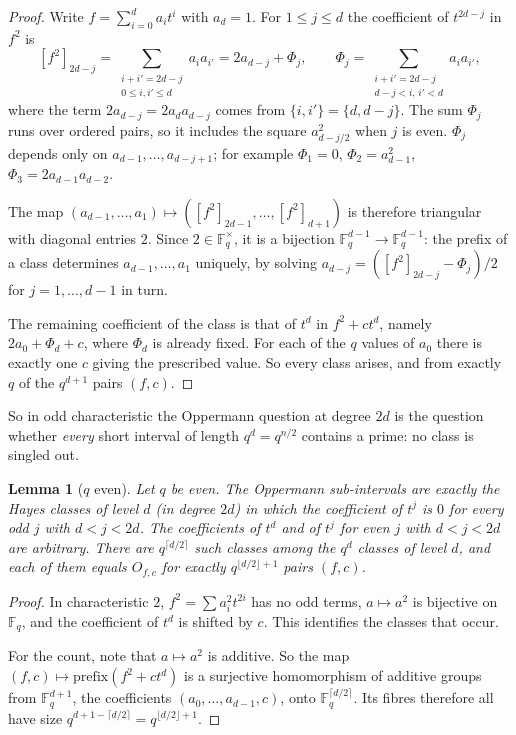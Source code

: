 \documentclass[11pt,a4paper]{amsart}
\newtheorem{lemma}[theorem]{Lemma}
\theoremstyle{definition}
\theoremstyle{remark}
\newcommand{\F}{\mathbb{F}}
\begin{document}
\begin{proof}
Write $f=\sum_{i=0}^da_it^i$ with $a_d=1$. For $1\le j\le d$ the coefficient of $t^{2d-j}$ in $f^2$ is
\[
[f^2]_{2d-j}=\sum_{\substack{i+i'=2d-j\\ 0\le i,i'\le d}}a_ia_{i'}
=2a_{d-j}+\Phi_j,\qquad
\Phi_j=\sum_{\substack{i+i'=2d-j\\ d-j<i,\,i'<d}}a_ia_{i'} ,
\]
where the term $2a_{d-j}=2a_da_{d-j}$ comes from $\{i,i'\}=\{d,d-j\}$. The sum $\Phi_j$ runs over ordered pairs, so
it includes the square $a_{d-j/2}^2$ when $j$ is even. $\Phi_j$ depends only on $a_{d-1},\dots,a_{d-j+1}$; for
example $\Phi_1=0$, $\Phi_2=a_{d-1}^2$, $\Phi_3=2a_{d-1}a_{d-2}$.

The map $(a_{d-1},\dots,a_1)\mapsto([f^2]_{2d-1},\dots,[f^2]_{d+1})$ is therefore triangular with diagonal entries
$2$. Since $2\in\F_q^\times$, it is a bijection $\F_q^{d-1}\to\F_q^{d-1}$: the prefix of a class determines
$a_{d-1},\dots,a_1$ uniquely, by solving $a_{d-j}=([f^2]_{2d-j}-\Phi_j)/2$ for $j=1,\dots,d-1$ in turn.

The remaining coefficient of the class is that of $t^d$ in $f^2+ct^d$, namely $2a_0+\Phi_d+c$, where $\Phi_d$ is
already fixed. For each of the $q$ values of $a_0$ there is exactly one $c$ giving the prescribed value. So every
class arises, and from exactly $q$ of the $q^{d+1}$ pairs $(f,c)$.
\end{proof}

So in odd characteristic the Oppermann question at degree $2d$ is the question whether \emph{every} short interval of
length $q^d=q^{n/2}$ contains a prime: no class is singled out.

\begin{lemma}[$q$ even]\label{lem:even}
Let $q$ be even. The Oppermann sub-intervals are exactly the Hayes classes of level $d$ (in degree $2d$) in which the
coefficient of $t^j$ is $0$ for every odd $j$ with $d<j<2d$. The coefficients of $t^d$ and of $t^j$ for even $j$ with
$d<j<2d$ are arbitrary. There are $q^{\lceil d/2\rceil}$ such classes among the $q^d$ classes of level $d$, and each
of them equals $O_{f,c}$ for exactly $q^{\lfloor d/2\rfloor+1}$ pairs $(f,c)$.
\end{lemma}

\begin{proof}
In characteristic $2$, $f^2=\sum a_i^2t^{2i}$ has no odd terms, $a\mapsto a^2$ is bijective on $\F_q$, and the
coefficient of $t^d$ is shifted by $c$. This identifies the classes that occur.

For the count, note that $a\mapsto a^2$ is additive. So the map $(f,c)\mapsto\mathrm{prefix}(f^2+ct^d)$ is a
surjective homomorphism of additive groups from $\F_q^{d+1}$, the coefficients $(a_0,\dots,a_{d-1},c)$, onto
$\F_q^{\lceil d/2\rceil}$. Its fibres therefore all have size $q^{d+1-\lceil d/2\rceil}=q^{\lfloor d/2\rfloor+1}$.
\end{proof}
\end{document}
